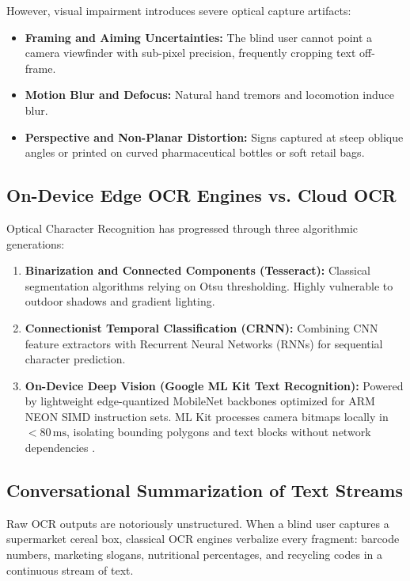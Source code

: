 \documentclass[10pt,twocolumn]{article}
\begin{document}
However, visual impairment introduces severe optical capture artifacts:
\begin{itemize}[leftmargin=*]
    \item \textbf{Framing and Aiming Uncertainties:} The blind user cannot point a camera viewfinder with sub-pixel precision, frequently cropping text off-frame.
    \item \textbf{Motion Blur and Defocus:} Natural hand tremors and locomotion induce blur.
    \item \textbf{Perspective and Non-Planar Distortion:} Signs captured at steep oblique angles or printed on curved pharmaceutical bottles or soft retail bags.
\end{itemize}

\subsection{On-Device Edge OCR Engines vs. Cloud OCR}
Optical Character Recognition has progressed through three algorithmic generations:
\begin{enumerate}[leftmargin=*]
    \item \textbf{Binarization and Connected Components (Tesseract):} Classical segmentation algorithms \cite{smith2007overview} relying on Otsu thresholding. Highly vulnerable to outdoor shadows and gradient lighting.
    \item \textbf{Connectionist Temporal Classification (CRNN):} Combining CNN feature extractors with Recurrent Neural Networks (RNNs) for sequential character prediction.
    \item \textbf{On-Device Deep Vision (Google ML Kit Text Recognition):} Powered by lightweight edge-quantized MobileNet backbones optimized for ARM NEON SIMD instruction sets. ML Kit processes camera bitmaps locally in $<80\,\text{ms}$, isolating bounding polygons and text blocks without network dependencies \cite{google_mlkit}.
\end{enumerate}

\subsection{Conversational Summarization of Text Streams}
Raw OCR outputs are notoriously unstructured. When a blind user captures a supermarket cereal box, classical OCR engines verbalize every fragment: barcode numbers, marketing slogans, nutritional percentages, and recycling codes in a continuous stream of text.
\end{document}
